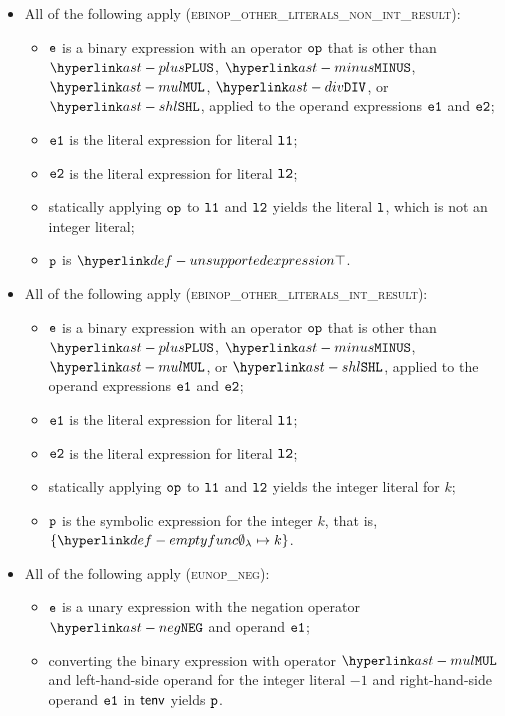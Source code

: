 \begin{itemize}
  \item All of the following apply (\textsc{ebinop\_other\_literals\_non\_int\_result}):
  \begin{itemize}
    \item $\texttt{e}$ is a binary expression with an operator $\texttt{op}$ that is other than $\PLUS$, $\MINUS$, $\MUL$, $\DIV$, or $\SHL$,
          applied to the operand expressions $\texttt{e1}$ and $\texttt{e2}$;
    \item $\texttt{e1}$ is the literal expression for literal $\texttt{l1}$;
    \item $\texttt{e2}$ is the literal expression for literal $\texttt{l2}$;
    \item statically applying $\texttt{op}$ to $\texttt{l1}$ and $\texttt{l2}$ yields the literal $\texttt{l}$, which is not an integer literal;
    \item $\texttt{p}$ is $\CannotBeTransformed$.
  \end{itemize}

  \item All of the following apply (\textsc{ebinop\_other\_literals\_int\_result}):
  \begin{itemize}
    \item $\texttt{e}$ is a binary expression with an operator $\texttt{op}$ that is other than $\PLUS$, $\MINUS$, $\MUL$, or $\SHL$,
          applied to the operand expressions $\texttt{e1}$ and $\texttt{e2}$;
    \item $\texttt{e1}$ is the literal expression for literal $\texttt{l1}$;
    \item $\texttt{e2}$ is the literal expression for literal $\texttt{l2}$;
    \item statically applying $\texttt{op}$ to $\texttt{l1}$ and $\texttt{l2}$ yields the integer literal for $k$;
    \item $\texttt{p}$ is the symbolic expression for the integer $k$, that is, $\{ \emptyfunc\mapsto k \}$.
  \end{itemize}

  \item All of the following apply (\textsc{eunop\_neg}):
  \begin{itemize}
    \item $\texttt{e}$ is a unary expression with the negation operator $\NEG$ and operand $\texttt{e1}$;
    \item converting the binary expression with operator $\MUL$ and left-hand-side operand for the integer literal $-1$ and
    right-hand-side operand $\texttt{e1}$ in $\textsf{tenv}$ yields $\texttt{p}$\ProseOrTypeErrorOrCannotBeTransformed.
  \end{itemize}


\end{itemize}
